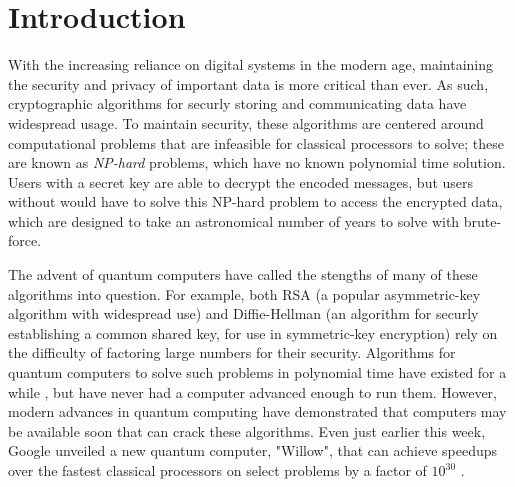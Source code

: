 
\section*{Introduction}

With the increasing reliance on digital systems in the
modern age, maintaining the security and privacy of
important data is more critical than ever. As such,
cryptographic algorithms for securly storing and
communicating data have widespread usage. To maintain
security, these algorithms are centered around
computational problems that are infeasible for classical
processors to solve; these are known as \textit{NP-hard}
problems, which have no known polynomial time solution.
Users with a secret key are able to decrypt the encoded
messages, but users without would have to solve this
NP-hard problem to access the encrypted data, which are
designed to take an astronomical number of years to solve
with brute-force.

The advent of quantum computers have called the stengths of
many of these algorithms into question. For example, both
RSA (a popular asymmetric-key algorithm with widespread
use) and Diffie-Hellman (an algorithm for securly
establishing a common shared key, for use in symmetric-key
encryption) rely on the difficulty of factoring large
numbers for their security. Algorithms for quantum
computers to solve such problems in polynomial time have
existed for a while \cite{shor}, but have never had a
computer advanced enough to run them. However, modern
advances in quantum computing have demonstrated that
computers may be available soon that can crack these
algorithms. Even just earlier this week, Google unveiled
a new quantum computer, "Willow", that can achieve
speedups over the fastest classical processors on select
problems by a factor of $10^{30}$ \cite{willow}.

